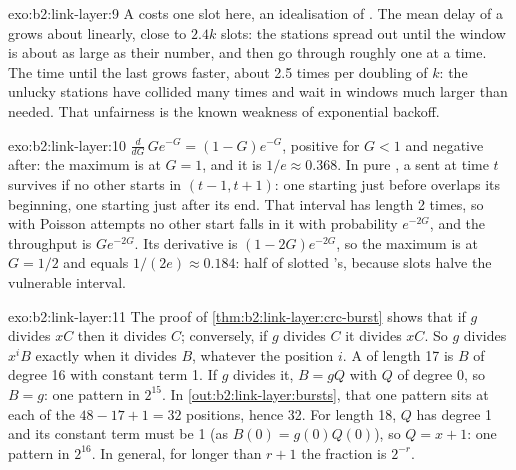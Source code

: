 \begin{solution}{exo:b2:link-layer:9}
A  costs one slot here, an idealisation of . The mean delay of a  grows about linearly, close to
$2.4k$ slots: the stations spread out until the window is about as large as their number, and then go through
roughly one at a time. The time until the last  grows faster, about 2.5 times per doubling of $k$: the unlucky
stations have collided many times and wait in windows much larger than needed. That unfairness is the known weakness
of exponential backoff.
\end{solution}

\begin{solution}{exo:b2:link-layer:10}
$\frac{d}{dG}\,G e^{-G} = (1 - G)e^{-G}$, positive for $G < 1$ and negative after: the maximum is at $G = 1$, and it is
$1/e \approx 0.368$. In pure , a  sent at time $t$ survives if no other  starts in $(t - 1, t + 1)$:
one starting just before overlaps its beginning, one starting just after its end. That interval has length 2 
times, so with Poisson attempts no other start falls in it with probability $e^{-2G}$, and the throughput is $G
e^{-2G}$. Its derivative is $(1 - 2G)e^{-2G}$, so the maximum is at $G = 1/2$ and equals $1/(2e) \approx 0.184$: half
of slotted 's, because slots halve the vulnerable interval.
\end{solution}

\begin{solution}{exo:b2:link-layer:11}
The proof of \cref{thm:b2:link-layer:crc-burst} shows that if $g$ divides $x C$ then it divides $C$; conversely, if
$g$ divides $C$ it divides $xC$. So $g$ divides $x^i B$ exactly when it divides $B$, whatever the position $i$.
A  of length 17 is $B$ of degree 16 with constant term 1. If $g$ divides it, $B = gQ$ with $Q$ of degree 0, so
$B = g$: one pattern in $2^{15}$. In \cref{out:b2:link-layer:bursts}, that one pattern sits at each of the $48 - 17 + 1
= 32$ positions, hence 32. For length 18, $Q$ has degree 1 and its constant term must be 1 (as $B(0) = g(0)Q(0)$), so
$Q = x + 1$: one pattern in $2^{16}$. In general, for  longer than $r + 1$ the fraction is $2^{-r}$.
\end{solution}

